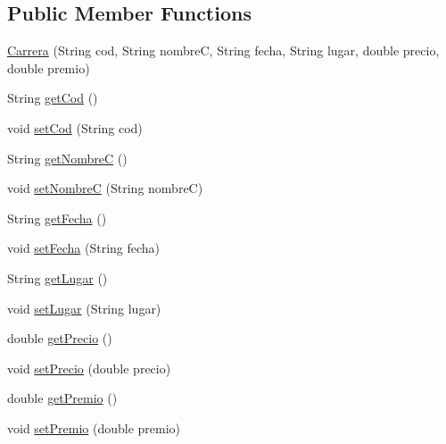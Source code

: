 \subsection*{Public Member Functions}
\begin{DoxyCompactItemize}
\item 
\mbox{\hyperlink{classes_1_1deusto_1_1server_1_1jdo_1_1_carrera_abab4ccd232d2b18ee46d2bf9e01c7363}{Carrera}} (String cod, String nombreC, String fecha, String lugar, double precio, double premio)
\item 
String \mbox{\hyperlink{classes_1_1deusto_1_1server_1_1jdo_1_1_carrera_a7d040dc8ca8b8c03ab6bcc1f470aae64}{get\+Cod}} ()
\item 
void \mbox{\hyperlink{classes_1_1deusto_1_1server_1_1jdo_1_1_carrera_aaea3763e7d08c9751ba9a2219b0c1642}{set\+Cod}} (String cod)
\item 
String \mbox{\hyperlink{classes_1_1deusto_1_1server_1_1jdo_1_1_carrera_a2fbdeca20ebef10040241fb0d6ef91da}{get\+NombreC}} ()
\item 
void \mbox{\hyperlink{classes_1_1deusto_1_1server_1_1jdo_1_1_carrera_afba01b2dd581b16f906961f626c96f07}{set\+NombreC}} (String nombreC)
\item 
String \mbox{\hyperlink{classes_1_1deusto_1_1server_1_1jdo_1_1_carrera_a5f71e8e338816f44709f4539a5b85915}{get\+Fecha}} ()
\item 
void \mbox{\hyperlink{classes_1_1deusto_1_1server_1_1jdo_1_1_carrera_a1a2a42d5c92d4e0e1113d6b7571f03b9}{set\+Fecha}} (String fecha)
\item 
String \mbox{\hyperlink{classes_1_1deusto_1_1server_1_1jdo_1_1_carrera_a52ac2d13359792631f5ab7ea6a030092}{get\+Lugar}} ()
\item 
void \mbox{\hyperlink{classes_1_1deusto_1_1server_1_1jdo_1_1_carrera_a5a9a8e9b26160e033b6246a8ea1a523f}{set\+Lugar}} (String lugar)
\item 
double \mbox{\hyperlink{classes_1_1deusto_1_1server_1_1jdo_1_1_carrera_ac86d4089cc5bd95211048a8946b57044}{get\+Precio}} ()
\item 
void \mbox{\hyperlink{classes_1_1deusto_1_1server_1_1jdo_1_1_carrera_ad573b2a0fbfe4889940497e81f5840aa}{set\+Precio}} (double precio)
\item 
double \mbox{\hyperlink{classes_1_1deusto_1_1server_1_1jdo_1_1_carrera_ad9837a1b0c4f2cf392fd44ac6e6b779d}{get\+Premio}} ()
\item 
void \mbox{\hyperlink{classes_1_1deusto_1_1server_1_1jdo_1_1_carrera_a815210f549d1d724250882806f9b62c4}{set\+Premio}} (double premio)
\end{DoxyCompactItemize}


